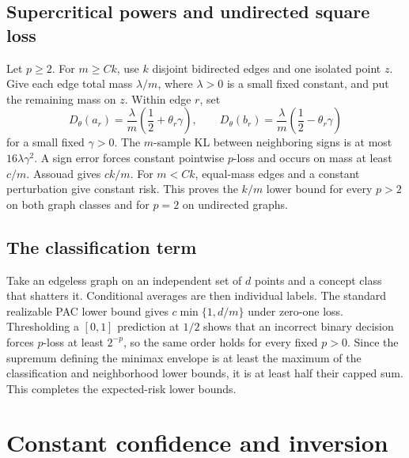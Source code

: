\subsection{Supercritical powers and undirected square loss}

Let $p\geq2$. For $m\geq Ck$, use $k$ disjoint bidirected edges and one isolated point $z$. Give each edge total mass $\lambda/m$, where $\lambda>0$ is a small fixed constant, and put the remaining mass on $z$. Within edge $r$, set
\[
D_\theta(a_r)=\frac\lambda m\left(\frac12+\theta_r\gamma\right),
\qquad
D_\theta(b_r)=\frac\lambda m\left(\frac12-\theta_r\gamma\right)
\]
for a small fixed $\gamma>0$. The $m$-sample KL between neighboring signs is at most $16\lambda\gamma^2$. A sign error forces constant pointwise $p$-loss and occurs on mass at least $c/m$. Assouad gives $ck/m$. For $m<Ck$, equal-mass edges and a constant perturbation give constant risk. This proves the $k/m$ lower bound for every $p>2$ on both graph classes and for $p=2$ on undirected graphs.

\subsection{The classification term}

Take an edgeless graph on an independent set of $d$ points and a concept class that shatters it. Conditional averages are then individual labels. The standard realizable PAC lower bound gives $c\min\{1,d/m\}$ under zero-one loss. Thresholding a $[0,1]$ prediction at $1/2$ shows that an incorrect binary decision forces $p$-loss at least $2^{-p}$, so the same order holds for every fixed $p>0$. Since the supremum defining the minimax envelope is at least the maximum of the classification and neighborhood lower bounds, it is at least half their capped sum. This completes the expected-risk lower bounds.

\section{Constant confidence and inversion}
\label{app:confidence}


